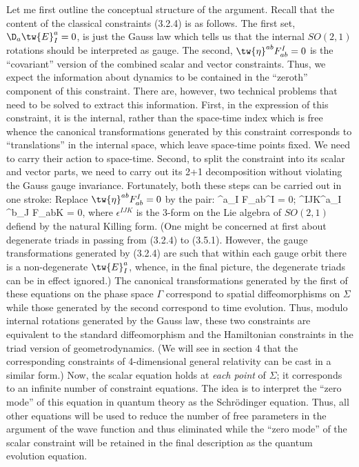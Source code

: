 Let me first outline the conceptual structure of the argument. Recall that
the content of the classical constraints (3.2.4) is as follows. The first set,
$\D_a\tw{E}^a_I= 0$,  is just the Gauss law which tells us that the internal
$SO(2,1)$ rotations should be interpreted as gauge. The second,
$\tw{\eta}^{ab}F_{ab}^I = 0$ is the ``covariant'' version of the combined
scalar and vector constraints. Thus, we expect the information about dynamics
to be contained in the ``zeroth'' component of this constraint. There are,
however, two technical problems that need to be solved to extract this
information. First, in the expression of this constraint, it is the internal,
rather than the space-time index which is free whence the canonical
transformations generated by this constraint corresponds to ``translations''
in the internal space, which leave space-time points fixed. We need to carry
their action to space-time. Second, to split
the constraint into its scalar and vector parts, we need to carry out its 2+1
decomposition without violating the Gauss gauge invariance.  Fortunately,
both these steps can be carried out in one stroke: Replace
$\tw{\eta}^{ab}F_{ab}^I = 0$ by the pair:
\bneq
{}^a_I F_{ab}^I = 0; \quad \epsilon^{IJK}^a_I
^b_J\- F_{abK} = 0,
where $\epsilon^{IJK}$ is the 3-form on the Lie algebra of $SO(2,1)$
defiend by the natural Killing form. (One might be concerned at first about
degenerate triads in passing from (3.2.4) to (3.5.1). However, the gauge
transformations generated by (3.2.4) are such that within each gauge orbit
there is a non-degenerate $\tw{E}^a_I$, whence, in the final picture, the
degenerate triads can be in effect ignored.) The canonical transformations
generated by the first of these equations on the phase space $\Gamma$
correspond to spatial diffeomorphisms on $\Sigma$ while those generated by
the second correspond to time evolution. Thus, modulo internal rotations
generated by the Gauss law, these two constraints are equivalent to the
standard diffeomorphism and the Hamiltonian constraints in the triad version
of geometrodynamics. (We will see in section 4 that the corresponding
constraints of
4-dimensional general relativity can be cast in a similar form.) Now, the
scalar equation holds at {\it each point} of $\Sigma$; it corresponds to an
infinite number of constraint equations. The idea is to interpret the ``zero
mode'' of this equation in quantum theory as the Schr\"odinger equation. Thus,
all other equations will be used to reduce the number of free parameters in
the argument of the wave function and thus eliminated while the ``zero mode''
of the scalar constraint will be retained in the final description as the
quantum evolution equation.

